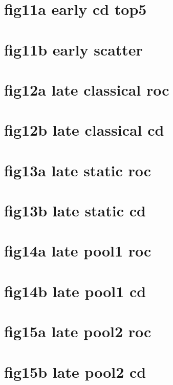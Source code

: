\documentclass{article}
\begin{document}
\section*{fig11a early cd top5}
\resizebox{\linewidth}{!}{}
\clearpage
\section*{fig11b early scatter}
\resizebox{\linewidth}{!}{}
\clearpage
\section*{fig12a late classical roc}
\resizebox{\linewidth}{!}{}
\clearpage
\section*{fig12b late classical cd}
\resizebox{\linewidth}{!}{}
\clearpage
\section*{fig13a late static roc}
\resizebox{\linewidth}{!}{}
\clearpage
\section*{fig13b late static cd}
\resizebox{\linewidth}{!}{}
\clearpage
\section*{fig14a late pool1 roc}
\resizebox{\linewidth}{!}{}
\clearpage
\section*{fig14b late pool1 cd}
\resizebox{\linewidth}{!}{}
\clearpage
\section*{fig15a late pool2 roc}
\resizebox{\linewidth}{!}{}
\clearpage
\section*{fig15b late pool2 cd}
\resizebox{\linewidth}{!}{}
\clearpage
\end{document}
